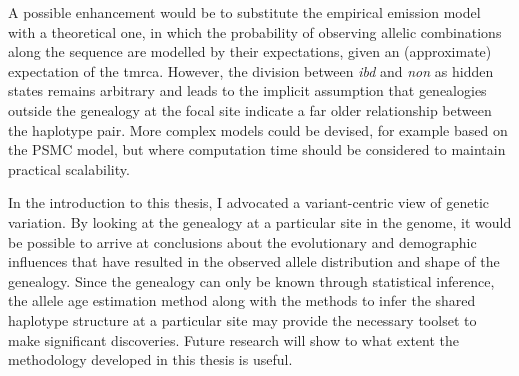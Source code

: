 A possible enhancement would be to substitute the empirical emission model with a theoretical one, in which the probability of observing allelic combinations along the sequence are modelled by their expectations, given an (approximate) expectation of the \gls{tmrca}.
However, the division between \emph{ibd} and \emph{non} as hidden states remains arbitrary and leads to the implicit assumption that genealogies outside the genealogy at the focal site indicate a far older relationship between the haplotype pair.
More complex models could be devised, for example based on the PSMC model, but where computation time should be considered to maintain practical scalability.


In the introduction to this thesis, I advocated a variant-centric view of genetic variation.
By looking at the genealogy at a particular site in the genome, it would be possible to arrive at conclusions about the evolutionary and demographic influences that have resulted in the observed allele distribution and shape of the genealogy.
Since the genealogy can only be known through statistical inference, the allele age estimation method along with the methods to infer the shared haplotype structure at a particular site may provide the necessary toolset to make significant discoveries.
Future research will show to what extent the methodology developed in this thesis is useful.




